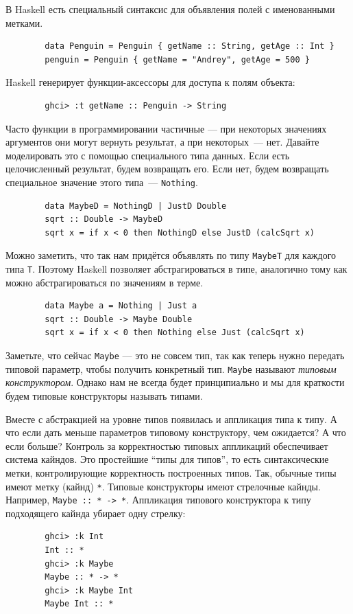 \documentclass[12pt]{article}
\newcommand{\point}[1]{{\color{blue}\textit{#1}}} %
\begin{document}
    В Haskell есть специальный синтаксис для объявления полей с именованными метками.
    \begin{verbatim}
        data Penguin = Penguin { getName :: String, getAge :: Int }
        penguin = Penguin { getName = "Andrey", getAge = 500 }
    \end{verbatim}
    Haskell генерирует функции-аксессоры для доступа к полям объекта:
    \begin{verbatim}
        ghci> :t getName :: Penguin -> String
    \end{verbatim}

    Часто функции в программировании частичные --- при некоторых значениях аргументов они могут вернуть результат, а при некоторых~--- нет.
    Давайте моделировать это с помощью специального типа данных.
    Если есть целочисленный результат, будем возвращать его.
    Если нет, будем возвращать специальное значение этого типа~--- \texttt{Nothing}.
    \begin{verbatim}
        data MaybeD = NothingD | JustD Double
        sqrt :: Double -> MaybeD
        sqrt x = if x < 0 then NothingD else JustD (calcSqrt x)
    \end{verbatim}

    Можно заметить, что так нам придётся объявлять по типу \texttt{MaybeT} для каждого типа \texttt{T}.
    Поэтому Haskell позволяет абстрагироваться в типе, аналогично тому как можно абстрагироваться по значениям в терме.
    \begin{verbatim}
        data Maybe a = Nothing | Just a
        sqrt :: Double -> Maybe Double
        sqrt x = if x < 0 then Nothing else Just (calcSqrt x)
    \end{verbatim}

    Заметьте, что сейчас \texttt{Maybe} --- это не совсем тип, так как теперь нужно передать типовой параметр, чтобы получить конкретный тип.
    \texttt{Maybe} называют \point{типовым конструктором}.
    Однако нам не всегда будет принципиально и мы для краткости будем типовые конструкторы называть типами.

    Вместе с абстракцией на уровне типов появилась и аппликация типа к типу.
    А что если дать меньше параметров типовому конструктору, чем ожидается?
    А что если больше?
    Контроль за корректностью типовых аппликаций обеспечивает система кайндов.
    Это простейшие ``типы для типов'', то есть синтаксические метки, контролирующие корректность построенных типов.
    Так, обычные типы имеют метку (кайнд) \texttt{*}.
    Типовые конструкторы имеют стрелочные кайнды.
    Например, \texttt{Maybe :: * -> *}.
    Аппликация типового конструктора к типу подходящего кайнда убирает одну стрелку:
    \begin{verbatim}
        ghci> :k Int
        Int :: *
        ghci> :k Maybe
        Maybe :: * -> *
        ghci> :k Maybe Int
        Maybe Int :: *
    \end{verbatim}
\end{document}
